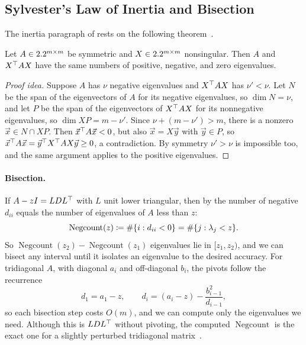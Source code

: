 \subsection{Sylvester's Law of Inertia and Bisection}

The inertia paragraph of  rests on the following theorem~\cite[Theorem 5.3]{Demmel}.

\begin{theorem}
  \label{thm:sylvester-inertia}
  Let $A \in 2.2^{m \times m}$ be symmetric and $X \in 2.2^{m \times m}$ nonsingular. Then $A$ and $X^\top AX$ have the same numbers of positive, negative, and zero eigenvalues.
\end{theorem}

\begin{proof}[Proof idea]
  Suppose $A$ has $\nu$ negative eigenvalues and $X^\top AX$ has $\nu' < \nu$. Let $N$ be the span of the eigenvectors of $A$ for its negative eigenvalues, so $\dim N = \nu$, and let $P$ be the span of the eigenvectors of $X^\top AX$ for its nonnegative eigenvalues, so $\dim XP = m - \nu'$. Since $\nu + (m - \nu') > m$, there is a nonzero $\vec{x} \in N \cap XP$. Then $\vec{x}^\top A\vec{x} < 0$, but also $\vec{x} = X\vec{y}$ with $\vec{y} \in P$, so $\vec{x}^\top A\vec{x} = \vec{y}^\top X^\top AX\vec{y} \ge 0$, a contradiction. By symmetry $\nu' > \nu$ is impossible too, and the same argument applies to the positive eigenvalues.
\end{proof}

\paragraph{Bisection.} If $A - zI = LDL^\top$ with $L$ unit lower triangular, then by  the number of negative $d_{ii}$ equals the number of eigenvalues of $A$ less than $z$:
\begin{equation}
  \operatorname{Negcount}(z) \coloneqq \#\{i : d_{ii} < 0\} = \#\{j : \lambda_j < z\}.
\end{equation}
So $\operatorname{Negcount}(z_2) - \operatorname{Negcount}(z_1)$ eigenvalues lie in $[z_1, z_2)$, and we can bisect any interval until it isolates an eigenvalue to the desired accuracy. For tridiagonal $A$, with diagonal $a_i$ and off-diagonal $b_i$, the pivots follow the recurrence
\begin{equation}
  d_1 = a_1 - z, \qquad d_i = (a_i - z) - \frac{b_{i-1}^2}{d_{i-1}},
\end{equation}
so each bisection step costs $O(m)$, and we can compute only the eigenvalues we need. Although this is $LDL^\top$ without pivoting, the computed $\operatorname{Negcount}$ is the exact one for a slightly perturbed tridiagonal matrix~\cite[Lemma 5.3]{Demmel}.
